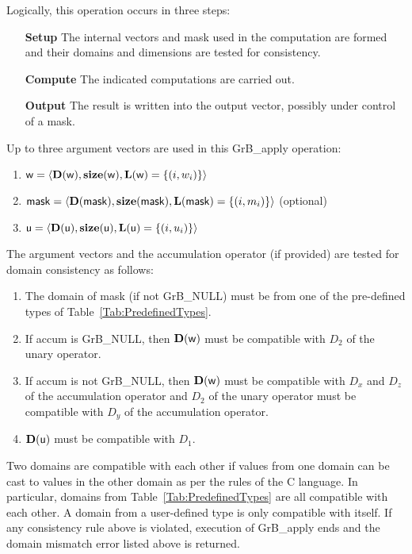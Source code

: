 Logically, this operation occurs in three steps:
\begin{enumerate}[leftmargin=0.75in]
\item[\bf Setup] The internal vectors and mask used in the computation are formed 
and their domains and dimensions are tested for consistency.
\item[\bf Compute] The indicated computations are carried out.
\item[\bf Output] The result is written into the output vector, possibly under 
control of a mask.
\end{enumerate}

Up to three argument vectors are used in this {\sf GrB\_apply} operation:
\begin{enumerate}
	\item ${\sf w} = \langle \bold{D}({\sf w}),\bold{size}({\sf w}),
    \bold{L}({\sf w}) = \{(i,w_i) \} \rangle$

	\item ${\sf mask} = \langle \bold{D}({\sf mask}),\bold{size}({\sf mask}),
    \bold{L}({\sf mask}) = \{(i,m_i) \} \rangle$ (optional)

	\item ${\sf u} = \langle \bold{D}({\sf u}),\bold{size}({\sf u}),
    \bold{L}({\sf u}) = \{(i,u_i) \} \rangle$
\end{enumerate}

The argument vectors and the accumulation 
operator (if provided) are tested for domain consistency as follows:
\begin{enumerate}
	\item The domain of {\sf mask} (if not {\sf GrB\_NULL}) must be from one of 
    the pre-defined types of Table~\ref{Tab:PredefinedTypes}.

	\item If {\sf accum} is {\sf GrB\_NULL}, then $\bold{D}({\sf w})$ must be 
    compatible with $D_2$ of the unary operator.

	\item If {\sf accum} is not {\sf GrB\_NULL}, then $\bold{D}({\sf w})$ must be
    compatible with $D_x$ and $D_z$ of the accumulation operator and 
    $D_2$ of the unary operator must be compatible with $D_y$ of the accumulation operator.

	\item $\bold{D}({\sf u})$ must be compatible with $D_1$.
\end{enumerate}
Two domains are compatible with each other if values from one domain can be cast 
to values in the other domain as per the rules of the C language.
In particular, domains from Table~\ref{Tab:PredefinedTypes} are all compatible 
with each other. A domain from a user-defined type is only compatible with itself.
If any consistency rule above is violated, execution of {\sf GrB\_apply} ends
and the domain mismatch error listed above is returned.


